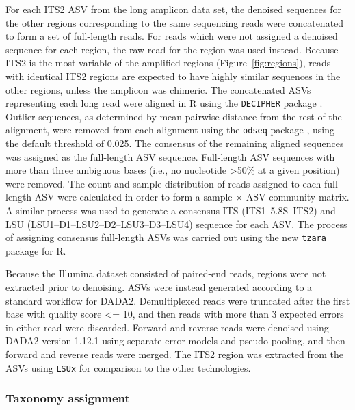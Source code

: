 \documentclass[
  12pt,
]{article}
\begin{document}
For each ITS2 ASV from the long amplicon data set, the denoised sequences for the other regions corresponding to the same sequencing reads were concatenated to form a set of full-length reads.
For reads which were not assigned a denoised sequence for each region, the raw read for the region was used instead.
Because ITS2 is the most variable of the amplified regions (Figure~\ref{fig:regions}), reads with identical ITS2 regions are expected to have highly similar sequences in the other regions, unless the amplicon was chimeric.
The concatenated ASVs representing each long read were aligned in R using the \texttt{DECIPHER} package \autocite{wright2015}.
Outlier sequences, as determined by mean pairwise distance from the rest of the alignment, were removed from each alignment using the \texttt{odseq} package \autocite{jehl2015}, using the default threshold of 0.025.
The consensus of the remaining aligned sequences was assigned as the full-length ASV sequence.
Full-length ASV sequences with more than three ambiguous bases (i.e., no nucleotide \textgreater50\% at a given position) were removed.
The count and sample distribution of reads assigned to each full-length ASV were calculated in order to form a sample × ASV community matrix.
A similar process was used to generate a consensus ITS (ITS1--5.8S--ITS2) and LSU (LSU1--D1--LSU2--D2--LSU3--D3--LSU4) sequence for each ASV.
The process of assigning consensus full-length ASVs was carried out using the new \texttt{tzara} package for R.

Because the Illumina dataset consisted of paired-end reads, regions were not extracted prior to denoising.
ASVs were instead generated according to a standard workflow for DADA2.
Demultiplexed reads were truncated after the first base with quality score \textless= 10, and then reads with more than 3 expected errors in either read were discarded.
Forward and reverse reads were denoised using DADA2 version 1.12.1 \autocite{callahan2016} using separate error models and pseudo-pooling, and then forward and reverse reads were merged.
The ITS2 region was extracted from the ASVs using \texttt{LSUx} for comparison to the other technologies.

\hypertarget{taxonomy-assignment}{%
\subsubsection{Taxonomy assignment}\label{taxonomy-assignment}}
\end{document}

